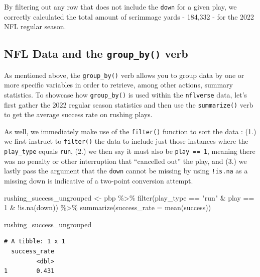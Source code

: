 \documentclass[
  letterpaper,
]{krantz}
\newenvironment{Shaded}{\begin{snugshade}}{\end{snugshade}}
\newcommand{\AttributeTok}[1]{\textcolor[rgb]{0.40,0.45,0.13}{#1}}
\newcommand{\DecValTok}[1]{\textcolor[rgb]{0.68,0.00,0.00}{#1}}
\newcommand{\FunctionTok}[1]{\textcolor[rgb]{0.28,0.35,0.67}{#1}}
\newcommand{\NormalTok}[1]{\textcolor[rgb]{0.00,0.23,0.31}{#1}}
\newcommand{\OtherTok}[1]{\textcolor[rgb]{0.00,0.23,0.31}{#1}}
\newcommand{\SpecialCharTok}[1]{\textcolor[rgb]{0.37,0.37,0.37}{#1}}
\newcommand{\StringTok}[1]{\textcolor[rgb]{0.13,0.47,0.30}{#1}}
\begin{document}
By filtering out any row that does not include the \texttt{down} for a
given play, we correctly calculated the total amount of scrimmage yards
- 184,332 - for the 2022 NFL regular season.

\hypertarget{nfl-data-and-the-group_by-verb}{%
\subsection{\texorpdfstring{NFL Data and the \texttt{group\_by()}
verb}{NFL Data and the group\_by() verb}}\label{nfl-data-and-the-group_by-verb}}

As mentioned above, the \texttt{group\_by()} verb allows you to group
data by one or more specific variables in order to retrieve, among other
actions, summary statistics. To showcase how \texttt{group\_by()} is
used within the \texttt{nflverse} data, let's first gather the 2022
regular season statistics and then use the \texttt{summarize()} verb to
get the average success rate on rushing plays.

As well, we immediately make use of the \texttt{filter()} function to
sort the data : (1.) we first instruct to \texttt{filter()} the data to
include just those instances where the \texttt{play\_type} equals
\texttt{run}, (2.) we then say it must also be \texttt{play\ ==\ 1},
meaning there was no penalty or other interruption that ``cancelled
out'' the play, and (3.) we lastly pass the argument that the
\texttt{down} cannot be missing by using \texttt{!is.na} as a missing
down is indicative of a two-point conversion attempt.

\begin{Shaded}
\begin{Highlighting}[]
\NormalTok{rushing\_success\_ungrouped }\OtherTok{\textless{}{-}}\NormalTok{ pbp }\SpecialCharTok{\%\textgreater{}\%}
  \FunctionTok{filter}\NormalTok{(play\_type }\SpecialCharTok{==} \StringTok{"run"} \SpecialCharTok{\&}\NormalTok{ play }\SpecialCharTok{==} \DecValTok{1} \SpecialCharTok{\&} \SpecialCharTok{!}\FunctionTok{is.na}\NormalTok{(down)) }\SpecialCharTok{\%\textgreater{}\%}
  \FunctionTok{summarize}\NormalTok{(}\AttributeTok{success\_rate =} \FunctionTok{mean}\NormalTok{(success))}

\NormalTok{rushing\_success\_ungrouped}
\end{Highlighting}
\end{Shaded}

\begin{verbatim}
# A tibble: 1 x 1
  success_rate
         <dbl>
1        0.431
\end{verbatim}
\end{document}
